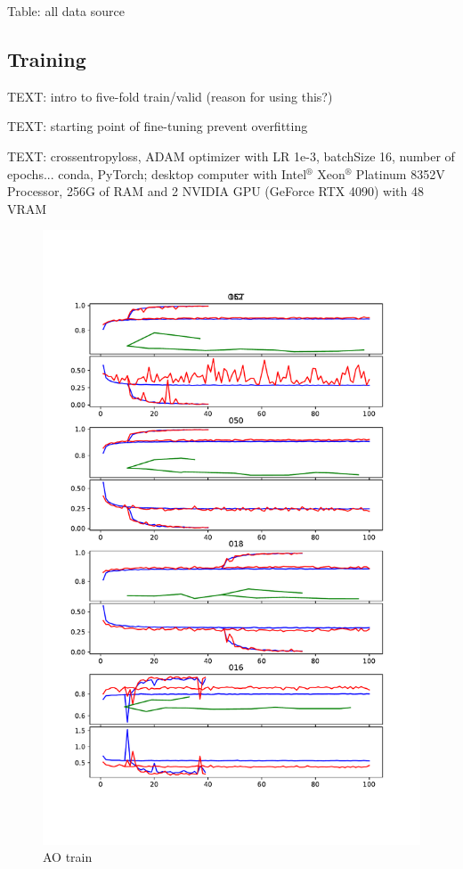 \documentclass{article}
\begin{document}
			Table: all data source
			
		\subsection{Training}
			
			TEXT: intro to five-fold train/valid (reason for using this?)
			
			TEXT: starting point of fine-tuning
			prevent overfitting
			
			TEXT: crossentropyloss, ADAM optimizer with LR 1e-3, batchSize 16, number of epochs...
			conda, PyTorch;
			desktop computer with Intel$^®$ Xeon$^®$ Platinum 8352V Processor, 256G of RAM and 2 NVIDIA GPU (GeForce RTX 4090) with 48 VRAM
			
			\begin{figure}[htbp]
				\centering
				\includegraphics[width=\linewidth]{Figs/abnormity_OCT_loss_and_acc.pdf}
				\caption{AO train}
				\vspace{0.3cm}
				\label{fig:AO_train}
			\end{figure}
			
\end{document}
